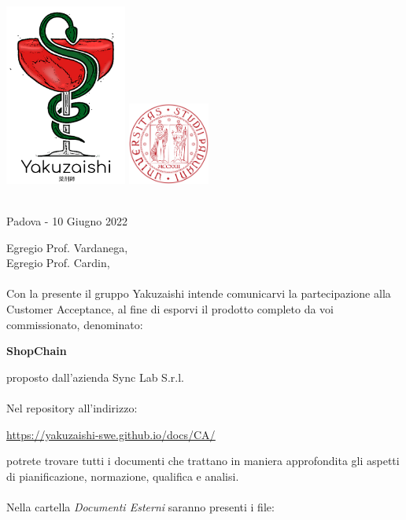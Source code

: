 \documentclass[a4paper, 10pt]{article}
\begin{document}
\begin{center}
\includegraphics[width=0.3\textwidth]{../template/images/logo.png}
\hspace{3cm}
\includegraphics[width=0.2\textwidth]{../template/images/logoUnipd.png}\\
\end{center}
\begin{flushright}
    \
    \textbf{}\\
    Padova - 10 Giugno 2022
\end{flushright}
Egregio Prof. Vardanega,\\
Egregio Prof. Cardin,\\\\
Con la presente il gruppo Yakuzaishi intende comunicarvi la partecipazione alla Customer Acceptance, al fine di esporvi il prodotto completo da voi commissionato, denominato:
\begin{center}
    \textbf{ShopChain}
\end{center}
proposto dall'azienda Sync Lab S.r.l.\\\\
Nel repository all'indirizzo:
\begin{center}
    \href{https://yakuzaishi-swe.github.io/docs/CA/}{\underline{https://yakuzaishi-swe.github.io/docs/CA/}}\\ 
\end{center}
potrete trovare tutti i documenti che trattano in maniera approfondita gli aspetti di pianificazione, normazione, qualifica e analisi.\\\\
Nella cartella \textit{Documenti Esterni} saranno presenti i file:
\end{document}

